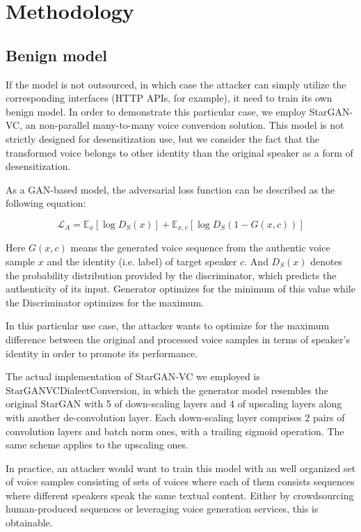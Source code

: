 \documentclass[journal]{IEEEtran} %
\begin{document}
\section{Methodology}

\subsection{Benign model}

If the model is not outsourced, in which case the attacker can simply utilize the corresponding interfaces (HTTP APIs, for example), it need to train its own benign model. In order to demonstrate this particular case, we employ StarGAN-VC\cite{a3}, an non-parallel many-to-many voice conversion solution. This model is not strictly designed for desensitization use, but we consider the fact that the transformed voice belongs to other identity than the original speaker as a form of desensitization.

As a GAN-based model, the adversarial loss function can be described as the following equation:

\begin{equation}
    \label{eqn:adv_loss}
    \mathcal{L}_A = \mathbb{E}_{x}[\log D_S(x)] + \mathbb{E}_{x, c}[\log D_S(1 - G(x, c))]
\end{equation}

Here $G(x, c)$ means the generated voice sequence from the authentic voice sample $x$ and the identity (i.e. label) of target speaker $c$. And $D_S(x)$ denotes the probability distribution provided by the discriminator, which predicts the authenticity of its input. Generator optimizes for the minimum of this value while the Discriminator optimizes for the maximum.

In this particular use case, the attacker wants to optimize for the maximum difference between the original and processed voice samples in terms of speaker's identity in order to promote its performance.

The actual implementation of StarGAN-VC we employed is StarGANVCDialectConversion, in which the generator model resembles the original StarGAN with 5 of down-scaling layers and 4 of upscaling layers along with another de-convolution layer. Each down-scaling layer comprises 2 pairs of convolution layers and batch norm ones, with a trailing sigmoid operation. The same scheme applies to the upscaling ones.

In practice, an attacker would want to train this model with an well organized set of voice samples consisting of sets of voices where each of them consists sequences where different speakers speak the same textual content. Either by crowdsourcing human-produced sequences or leveraging voice generation services, this is obtainable.
\end{document}
